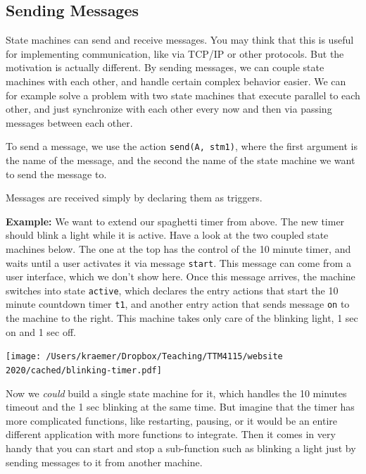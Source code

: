 \documentclass[10pt, twoside, twocolumn]{book}
\let\origfigure=\figure
\let\endorigfigure=\endfigure
\renewenvironment{figure}[1][]{%
  \origfigure[H]
}{%
  \endorigfigure
}
\begin{document}
\hypertarget{sending-messages}{%
\subsection{Sending Messages}\label{sending-messages}}

State machines can send and receive messages. You may think that this is
useful for implementing communication, like via TCP/IP or other
protocols. But the motivation is actually different. By sending
messages, we can couple state machines with each other, and handle
certain complex behavior easier. We can for example solve a problem with
two state machines that execute parallel to each other, and just
synchronize with each other every now and then via passing messages
between each other.

To send a message, we use the action
\texttt{send(\textquotesingle{}A\textquotesingle{},\ \textquotesingle{}stm1\textquotesingle{})},
where the first argument is the name of the message, and the second the
name of the state machine we want to send the message to.

Messages are received simply by declaring them as triggers.

\textbf{Example:} We want to extend our spaghetti timer from above. The
new timer should blink a light while it is active. Have a look at the
two coupled state machines below. The one at the top has the control of
the 10 minute timer, and waits until a user activates it via message
\texttt{start}. This message can come from a user interface, which we
don't show here. Once this message arrives, the machine switches into
state \texttt{active}, which declares the entry actions that start the
10 minute countdown timer \texttt{t1}, and another entry action that
sends message \texttt{on} to the machine to the right. This machine
takes only care of the blinking light, 1 sec on and 1 sec off.

\begin{figure}[htbp]
\begin{center}
\texttt{[image: /Users/kraemer/Dropbox/Teaching/TTM4115/website 2020/cached/blinking-timer.pdf]}%
\label{default}
\end{center}
\end{figure}
Now we \emph{could} build a single state machine for it, which handles
the 10 minutes timeout and the 1 sec blinking at the same time. But
imagine that the timer has more complicated functions, like restarting,
pausing, or it would be an entire different application with more
functions to integrate. Then it comes in very handy that you can start
and stop a sub-function such as blinking a light just by sending
messages to it from another machine.
\end{document}
